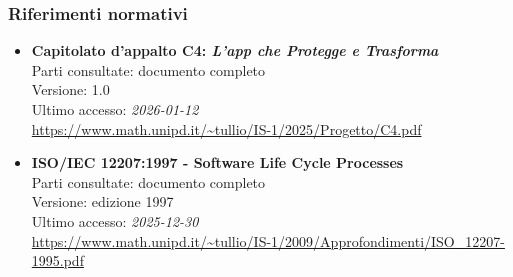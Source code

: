\documentclass[a4paper,12pt]{article}
\begin{document}
\subsubsection{Riferimenti normativi}
\begin{itemize}\raggedright
    \item \textbf{Capitolato d'appalto C4: \emph{L'app che Protegge e Trasforma}}\\
    Parti consultate: documento completo\\
    Versione: 1.0\\
    Ultimo accesso: \textit{2026-01-12}\\
    \url{https://www.math.unipd.it/~tullio/IS-1/2025/Progetto/C4.pdf}
    \item \textbf{ISO/IEC 12207:1997 - Software Life Cycle Processes}\\
    Parti consultate: documento completo\\
    Versione: edizione 1997\\
    Ultimo accesso: \textit{2025-12-30}\\
    \url{https://www.math.unipd.it/~tullio/IS-1/2009/Approfondimenti/ISO_12207-1995.pdf}
\end{itemize}
\end{document}
